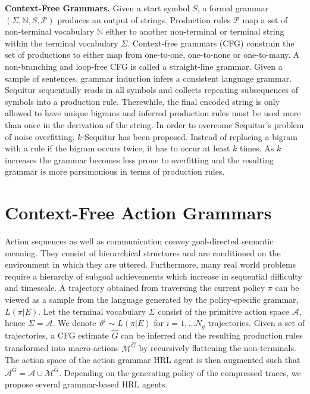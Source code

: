 \documentclass[10pt,letterpaper]{article}
\begin{document}
\textbf{Context-Free Grammars.} Given a start symbol $S$, a formal grammar $(\Sigma, \mathbb{N}, S, \mathcal{P})$ produces an output of strings. Production rules $\mathcal{P}$ map a set of non-terminal vocabulary $\mathbb{N}$ either to another non-terminal or terminal string within the terminal vocabulary $\Sigma$.
Context-free grammars (CFG) \cite{Chomsky_1959a} constrain the set of productions to either map from one-to-one, one-to-none or one-to-many. A non-branching and loop-free CFG is called a straight-line grammar. Given a sample of sentences, grammar induction infers a consistent language grammar.
Sequitur \cite{Manning_1997} sequentially reads in all symbols and collects repeating subsequences of symbols into a production rule. Therewhile, the final encoded string is only allowed to have unique bigrams and inferred production rules must be used more than once in the derivation of the string.
In order to overcome Sequitur's problem of noise overfitting, $k$-Sequitur \cite{Stout_2018} has been proposed. Instead of replacing a bigram with a rule if the bigram occurs twice, it has to occur at least $k$ times. As $k$ increases the grammar becomes less prone to overfitting and the resulting grammar is more parsimonious in terms of production rules. 

\section{Context-Free Action Grammars}

Action sequences as well as communication convey goal-directed semantic meaning. They consist of hierarchical structures and are conditioned on the environment in which they are uttered. 
Furthermore, many real world problems require a hierarchy of subgoal achievements which increase in sequential difficulty and timescale.
A trajectory obtained from traversing the current policy $\pi$ can be viewed as a sample from the language generated by the policy-specific grammar, $L(\pi|E)$. Let the terminal vocabulary $\Sigma$ consist of the primitive action space $\mathcal{A}$, hence $\Sigma = \mathcal{A}$. We denote  $\vartheta^i \sim L(\pi|E)$ for $i = 1, \dots N_g$ trajectories. Given a set of trajectories, a CFG estimate $\hat{G}$ can be inferred and the resulting production rules transformed into macro-actions $\mathcal{M}^{\hat{G}}$ by recursively flattening the non-terminals. The action space of the action grammar HRL agent is then augmented such that $\mathcal{A}^{\hat{G}} = \mathcal{A} \cup \mathcal{M}^{\hat{G}}$. Depending on the generating policy of the compressed traces, we propose several grammar-based HRL agents.
\end{document}
